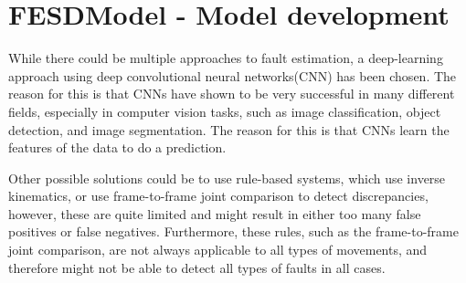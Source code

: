 \chapter[FESDModel]{FESDModel - Model development}
\label{sec:model_development}

While there could be multiple approaches to fault estimation, a deep-learning approach using deep convolutional neural networks(CNN) has been chosen. The reason for this is that CNNs have shown to be very successful in many different fields, especially in computer vision tasks, such as image classification, object detection, and image segmentation. The reason for this is that CNNs learn the features of the data to do a prediction.

Other possible solutions could be to use rule-based systems, which use inverse kinematics, or use frame-to-frame joint comparison to detect discrepancies, however, these are quite limited and might result in either too many false positives or false negatives. Furthermore, these rules, such as the frame-to-frame joint comparison, are not always applicable to all types of movements, and therefore might not be able to detect all types of faults in all cases.



